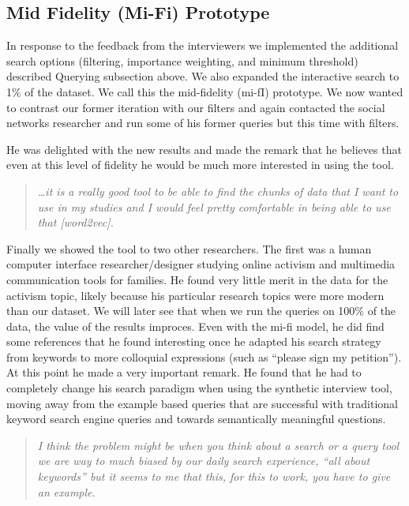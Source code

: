 \documentclass{sigchi}
\begin{document}
\subsection{Mid Fidelity (Mi-Fi) Prototype}
In response to the feedback from the interviewers we implemented the additional search options (filtering, importance weighting, and minimum threshold) described Querying subsection above. We also expanded the interactive search to 1\% of the dataset. We call this the mid-fidelity (mi-fI) prototype. We now wanted to contrast our former iteration with our filters and again contacted the social networks researcher and run some of his former queries but this time with filters. 

He was delighted with the new results and made the remark that he believes that even at this level of fidelity he would be much more interested in using the tool.
\begin{quote}
{\em
\dots it is a really good tool to be able to find the chunks of data that I want to use in my studies and I would feel pretty comfortable in being able to use that [word2vec].}
\end{quote}

Finally we showed the tool to two other researchers. The first was a human computer interface researcher/designer studying online activism and multimedia communication tools for families. He found very little merit in the data for the activism topic, likely because his particular research topics were more modern than our dataset. We will later see that when we run the queries on 100\% of the data, the value of the results improces. Even with the mi-fi model, he did find some references that he found interesting once he adapted his search strategy from keywords to more colloquial expressions (such as ``please sign my petition''). At this point he made a very important remark. He found that he had to completely change his search paradigm when using the synthetic interview tool, moving away from the example based queries that are successful with traditional keyword search engine queries and towards semantically meaningful questions. 

\begin{quote}
{\em
I think the problem might be when you think about a search or a query tool we are way to much biased by our daily search experience, ``all about keywords'' but it seems to me that this, for this to work, you have to give an example.
}\end{quote}
\end{document}

